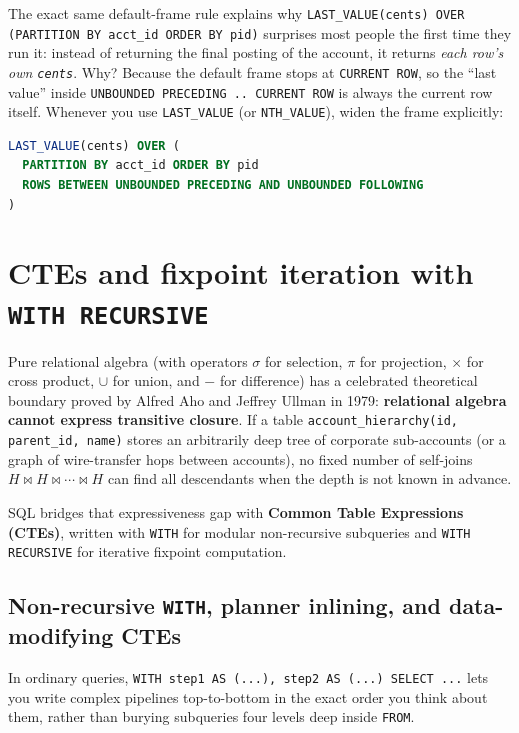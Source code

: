 \begin{trapbox}
The exact same default-frame rule explains why \texttt{LAST\_VALUE(cents) OVER (PARTITION BY acct\_id ORDER BY pid)} surprises most people the first time they run it: instead of returning the final posting of the account, it returns \emph{each row's own \texttt{cents}}. Why? Because the default frame stops at \texttt{CURRENT ROW}, so the ``last value'' inside \texttt{UNBOUNDED PRECEDING .. CURRENT ROW} is always the current row itself. Whenever you use \texttt{LAST\_VALUE} (or \texttt{NTH\_VALUE}), widen the frame explicitly:
\begin{lstlisting}[language=SQL]
LAST_VALUE(cents) OVER (
  PARTITION BY acct_id ORDER BY pid
  ROWS BETWEEN UNBOUNDED PRECEDING AND UNBOUNDED FOLLOWING
)
\end{lstlisting}
\end{trapbox}

\section{CTEs and fixpoint iteration with \texttt{WITH RECURSIVE}}
\label{sec:ch01-ctes}

Pure relational algebra (with operators $\sigma$ for selection, $\pi$ for projection, $\times$ for cross product, $\cup$ for union, and $-$ for difference) has a celebrated theoretical boundary proved by Alfred Aho and Jeffrey Ullman in 1979: \textbf{relational algebra cannot express transitive closure}. If a table \texttt{account\_hierarchy(id, parent\_id, name)} stores an arbitrarily deep tree of corporate sub-accounts (or a graph of wire-transfer hops between accounts), no fixed number of self-joins $H \bowtie H \bowtie \cdots \bowtie H$ can find all descendants when the depth is not known in advance.

SQL bridges that expressiveness gap with \textbf{Common Table Expressions (CTEs)}, written with \texttt{WITH} for modular non-recursive subqueries and \texttt{WITH RECURSIVE} for iterative fixpoint computation.

\subsection{Non-recursive \texttt{WITH}, planner inlining, and data-modifying CTEs}

In ordinary queries, \texttt{WITH step1 AS (...), step2 AS (...) SELECT ...} lets you write complex pipelines top-to-bottom in the exact order you think about them, rather than burying subqueries four levels deep inside \texttt{FROM}.

